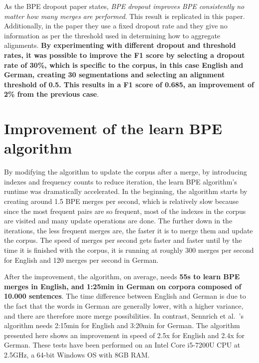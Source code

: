 As the BPE dropout paper states, \emph{BPE dropout improves BPE consistently no matter how many merges are performed}. This result is replicated in this paper. Additionally, in the paper they use a fixed dropout rate and they give no information as per the threshold used in determining how to aggregate alignments. \textbf{By experimenting with different dropout and threshold rates, it was possible to improve the F1 score by selecting a dropout rate of 30\%, which is specific to the corpus, in this case English and German, creating 30 segmentations and selecting an alignment threshold of 0.5. This results in a F1 score of 0.685, an improvement of 2\% from the previous case}.

\section{Improvement of the learn BPE algorithm}

By modifying the algorithm to update the corpus after a merge, by introducing indexes and frequency counts to reduce iteration, the learn BPE algorithm's runtime was dramatically accelerated. In the beginning, the algorithm starts by creating around 1.5 BPE merges per second, which is relatively slow because since the most frequent pairs are so frequent, most of the indexes in the corpus are visited and many update operations are done. The further down in the iterations, the less frequent merges are, the faster it is to merge them and update the corpus. The speed of merges per second gets faster and faster until by the time it is finished with the corpus, it is running at roughly 300 merges per second for English and 120 merges per second in German.

After the improvement, the algorithm, on average, needs \textbf{55s to learn BPE merges in English, and 1:25min in German on corpora composed of 10.000 sentences}. The time difference between English and German is due to the fact that the words in German are generally lower, with a higher variance, and there are therefore more merge possibilities. In contrast, Sennrich et al.~\cite{sennrich2015neural}'s algorithm needs 2:15min for English and 3:20min for German. The algorithm presented here shows an improvement in speed of 2.5x for English and 2.4x for German. These tests have been performed on an Intel Core i5-7200U CPU at 2.5GHz, a 64-bit Windows OS with 8GB RAM.

